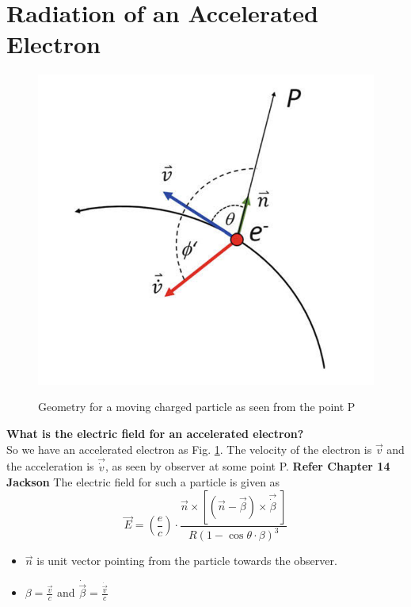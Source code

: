 \documentclass[11pt]{report}
\newcommand{\cc}[1]{\left({#1}\right)}
\newcommand{\rr}[1]{\left[{#1}\right]}
\newcommand{\vd}[1]{\dot{\vec{#1}}}
\begin{document}
\section{Radiation of an Accelerated Electron}
\begin{figure}[th]
\includegraphics[scale=0.7]{singleprad.png}\label{singleprad}
\caption{Geometry for a moving charged particle as seen from the point P}
\end{figure}
\textbf{What is the electric field for an accelerated electron?}\\
So we have an accelerated electron as Fig. \ref{singleprad}. The velocity of the electron is $\vec{v}$ and the acceleration is $\vec{\dot{v}}$, as seen by observer at some point P. \textbf{Refer Chapter 14 Jackson} The electric field for such a particle is given as
\begin{equation}
\vec{E}=\cc{\frac{e}{c}}\cdot \frac{\vec{n}\times \rr{\cc{\vec{n}-\vec{\beta}}\times \vec{\dot{\beta}}\;}}{R\cc{1-\cos\theta \cdot \beta}^3}
\end{equation}
\begin{itemize}
\item $\vec{n}$ is unit vector pointing from the particle towards the observer.
\item $\beta=\frac{\vec{v}}{c}$ and $\vd{\beta}=\frac{\vd{v}}{c}$
\end{itemize}
\end{document}
